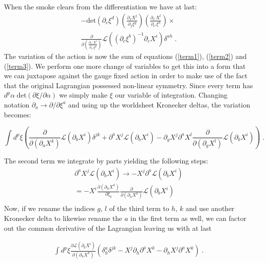 \documentclass[%
 reprint,
 amsmath,amssymb,
 aps,
]{revtex4-1}
\begin{document}
When the smoke clears from the differentiation we have at last:
\begin{eqnarray}
\label{term3}
    - \mathrm{det} ( \partial_e \xi^d )
    \left( \frac{\partial_f X^j}{\partial_f \xi^g} \right)
    \left( \frac{\partial_{c'} X^l}{\partial_{c'} \xi^h} \right) \times \\ \nonumber
    \frac{\partial}{\partial \left(
    \frac{\partial_{c''} X^l}{\partial_{c''} \xi^g} \right)}
    \mathcal{L}\left( (\partial_c \xi^b)^{-1} \partial_c X^i \right) \delta^{a h} \; .
\end{eqnarray}
The variation of the action is now the sum of equations (\ref{term1}), (\ref{term2}) and (\ref{term3}).  We perform one more change
of variables to get this into a form that we can juxtapose against the gauge fixed action in order to
make use of the fact that the original Lagrangian possessed non-linear symmetry.  Since
every term has $d^p \alpha\;\mathrm{det}\left( \partial \xi/\partial \alpha\right)$ we simply make $\xi$
our variable of integration. Changing notation $\partial_a \rightarrow \partial/\partial \xi^a $
and using up the worldsheet Kronecker deltas, the variation becomes:
\begin{widetext}
    \begin{equation}
    \label{diffeq}
        \int d^p \xi \left(
        \frac{\partial}{\partial (\partial_a X^k)} \mathcal{L}
        (\partial_b X^i) \delta^{j k} + \partial^a X^j \mathcal{L}(\partial_b X^i)
        - \partial_g X^j \partial^a X^l \frac{\partial}{\partial (\partial_g X^l)}
        \mathcal{L}(\partial_b X^i) \right) \; .
    \end{equation}
\end{widetext}
The second term we integrate by parts yielding the following steps:
\begin{gather}
    \partial^a X^j \mathcal{L}(\partial_b X^i) \rightarrow - X^j \partial^a \mathcal{L}(\partial_b X^i) \nonumber \\
    = - X^i \frac{\partial (\partial_h X^k)}{\partial \xi_a} \frac{\partial}{\partial (\partial_h X^k)} \mathcal{L}(\partial_b X^i) \nonumber \\
\end{gather}
Now, if we rename the indices $g$, $l$ of the third term to $h$, $k$ and use another Kronecker delta to likewise rename the $a$ in the first term as well,
we can factor out the common derivative of the Lagrangian leaving us with at last
\begin{widetext}
    \begin{eqnarray}
        \int d^p \xi \frac{\partial \mathcal{L}(\partial_b X^i)}{\partial \left( \partial_h X^k \right)}
        \left( \delta^a_h \delta^{j k} - X^j \partial_h \partial^a X^k - \partial_h X^j \partial^a X^k \right) \; . \nonumber
    \end{eqnarray}
\end{widetext}
\end{document}
